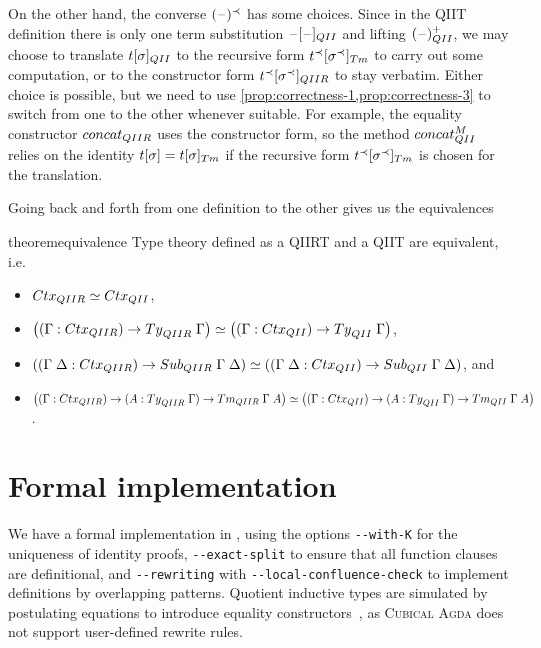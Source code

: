 \documentclass[a4paper,UKenglish,numberwithinsect,cleveref,thm-restate]{lipics-v2021}
\begin{document}
On the other hand, the converse $(\mathord{\hspace{1pt}\text{--}\hspace{1pt}})^{\prec}$ has some choices.
Since in the QIIT definition there is only one term substitution $\blank [\blank]_{\I}$ and lifting $(\blank)^+_{\I}$, we may choose to translate $t [\sigma]_{\I}$ to the recursive form $t^{\prec} [\sigma^{\prec}]_{\Tm}$ to carry out some computation, or to the constructor form $t^{\prec} [\sigma^{\prec}]_{\IR}$ to stay verbatim.
Either choice is possible, but we need to use \cref{prop:correctness-1,prop:correctness-3} to switch from one to the other whenever suitable.
For example, the equality constructor $\mathsf{concat}_{\IR}$ uses the constructor form, so the method $\mathsf{concat}^M_{\I}$ relies on the identity $\sub{t}{\sigma} = \subTm{t}{\sigma}$ if the recursive form $\subTm{t^{\prec}}{\sigma^{\prec}}$ is chosen for the translation.

Going back and forth from one definition to the other gives us the equivalences
\begin{restatable}{theorem}{equivalence}\label{thm:equivalence}
  Type theory defined as a QIIRT and a QIIT are equivalent, i.e.\ 
  \begin{itemize}
    \item $\eqv{\Ctx_{\IR}}{\Ctx_{\I}}$, 
    \item $\eqv{\left((\Gamma : \Ctx_{\IR})\to\Ty_{\IR}\;\Gamma\right)}{\left((\Gamma : \Ctx_{\I})\to\Ty_{\I}\;\Gamma\right)}$,
    \item $\eqv{\left((\Gamma\;\Delta : \Ctx_{\IR}) \to \Sub_{\IR}\;\Gamma\;\Delta\right)}%
               {\left((\Gamma\;\Delta: \Ctx_{\I}) \to \Sub_{\I}\;\Gamma\;\Delta\right)}$, and 
    \item $\eqv{\left((\Gamma : \Ctx_{\IR}) \to (A : \Ty_{\IR}\;\Gamma) \to \Tm_{\IR}\;\Gamma\;A\right)}
               {\left((\Gamma : \Ctx_{\I}) \to (A : \Ty_{\I}\;\Gamma) \to \Tm_{\I}\;\Gamma\;A\right)}$.
  \end{itemize}
\end{restatable}

\section{Formal implementation} \label{sec:formal-implementation}

We have a formal implementation in \Agda, using the options \texttt{-{}-with-K} for the uniqueness of identity proofs, \texttt{-{}-exact-split} to ensure that all function clauses are definitional, and \texttt{-{}-rewriting} with \texttt{-{}-local-confluence-check} \cite{Cockx2020,Cockx2021} to implement definitions by overlapping patterns.
Quotient inductive types are simulated by postulating equations to introduce equality constructors~\cite{Licata2011}, as \textsc{Cubical Agda} does not support user-defined rewrite rules.
\end{document}
